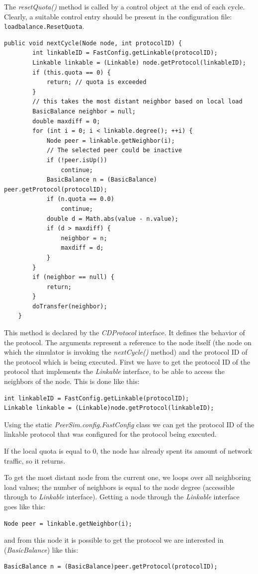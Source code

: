 \documentclass[a4paper,11pt]{article}
\begin{document}
The \emph{resetQuota()} method is called by a control object at
the end of each cycle. Clearly, a suitable control entry should be present
in the configuration file: \texttt{loadbalance.ResetQuota}.

\footnotesize
\begin{verbatim}
public void nextCycle(Node node, int protocolID) {
        int linkableID = FastConfig.getLinkable(protocolID);
        Linkable linkable = (Linkable) node.getProtocol(linkableID);
        if (this.quota == 0) {
            return; // quota is exceeded
        }
        // this takes the most distant neighbor based on local load
        BasicBalance neighbor = null;
        double maxdiff = 0;
        for (int i = 0; i < linkable.degree(); ++i) {
            Node peer = linkable.getNeighbor(i);
            // The selected peer could be inactive
            if (!peer.isUp())
                continue;
            BasicBalance n = (BasicBalance) peer.getProtocol(protocolID);
            if (n.quota == 0.0)
                continue;
            double d = Math.abs(value - n.value);
            if (d > maxdiff) {
                neighbor = n;
                maxdiff = d;
            }
        }
        if (neighbor == null) {
            return;
        }
        doTransfer(neighbor);
    }
\end{verbatim}
\normalsize

This method is declared by the \emph{CDProtocol} interface. It defines the
behavior of the protocol. The arguments represent a reference
to the node itself (the node on which the simulator is invoking the
\emph{nextCycle()} method) and the protocol ID of the protocol
which is being executed.
First we have to get the protocol ID of
the protocol that implements the \emph{Linkable} interface, to be able
to access the neighbors of the node.
This is done like this:
\begin{verbatim}
int linkableID = FastConfig.getLinkable(protocolID);
Linkable linkable = (Linkable)node.getProtocol(linkableID);
\end{verbatim}
Using the static \emph{PeerSim.config.FastConfig} class we can get the
protocol ID of the linkable protocol that was configured for the protocol
being executed.

If the local quota is equal to 0, the node has already
spent its amount of network traffic, so it returns.

To get the most distant node from the current one, we loops over
all neighboring load values; the number of neighbors is equal to the
node degree (accessible through to \emph{Linkable} interface). Getting a node
through the \emph{Linkable} interface goes like this:
\begin{verbatim}
Node peer = linkable.getNeighbor(i);
\end{verbatim}
and from this node it is possible
to get the protocol we are interested in (\emph{BasicBalance}) like this:
\begin{verbatim}
BasicBalance n = (BasicBalance)peer.getProtocol(protocolID);
\end{verbatim}
\end{document}
